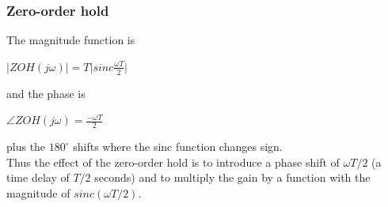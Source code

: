 \begin{frame}
	\frametitle{Zero-order hold}
	The magnitude function is\\
	\vspace{-1ex}
	\begin{center}
		$|ZOH(j\omega)| = T\Big|sinc\frac{\omega T}{2} \Big|$
	\end{center}
	\vspace{-1ex}
	and the phase is\\
	\vspace{-1ex}
	\begin{center}
		$\angle ZOH(j\omega)=\frac{-\omega T}{2}$
	\end{center}
	\vspace{-1ex}
	plus the $180^\circ$ shifts where the sinc function changes sign.\\
	\vspace{1em}
	Thus the effect of the zero-order hold is to introduce a phase shift of $\omega T/2$ (a time delay of $T/2$ seconds) and to multiply the gain by a function with the magnitude of $sinc(\omega T/2)$.
\end{frame}

